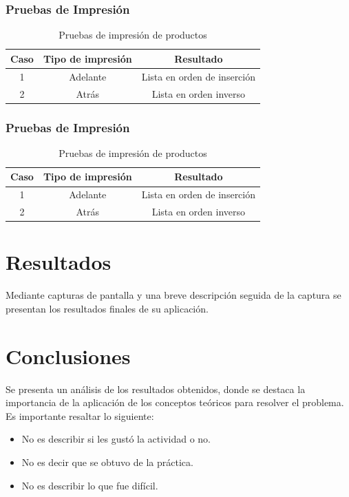 \documentclass[letterpaper,12pt,oneside]{article}
\begin{document}
\subsubsection{Pruebas de Impresión}

\begin{table}[H]
\centering
\begin{tabular}{|c|c|c|}
\hline
\textbf{Caso} & \textbf{Tipo de impresión} & \textbf{Resultado} \\
\hline
1 & Adelante & Lista en orden de inserción \\
2 & Atrás & Lista en orden inverso \\
\hline
\end{tabular}
\caption{Pruebas de impresión de productos}
\end{table}

\subsubsection{Pruebas de Impresión}

\begin{table}[H]
\centering
\begin{tabular}{|c|c|c|}
\hline
\textbf{Caso} & \textbf{Tipo de impresión} & \textbf{Resultado} \\
\hline
1 & Adelante & Lista en orden de inserción \\
2 & Atrás & Lista en orden inverso \\
\hline
\end{tabular}
\caption{Pruebas de impresión de productos}
\end{table}

\section{Resultados}

Mediante capturas de pantalla y una breve descripción seguida de la captura se presentan los resultados finales de su aplicación.

\section{Conclusiones}

Se presenta un análisis de los resultados obtenidos, donde se destaca la importancia de la aplicación de los conceptos teóricos para resolver el problema. Es importante resaltar lo siguiente:

\begin{itemize}
    \item No es describir si les gustó la actividad o no.
    \item No es decir que se obtuvo de la práctica.
    \item No es describir lo que fue difícil.
\end{itemize}

\printbibliography
\end{document}
